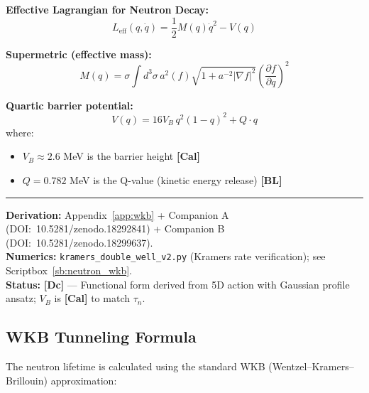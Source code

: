 \documentclass[11pt,a4paper]{article}
\newcommand{\tagDc}{\textcolor{blue!70!black}{\textbf{[Dc]}}}
\newcommand{\tagCal}{\textcolor{purple!70!black}{\textbf{[Cal]}}}
\newcommand{\tagBL}{\textcolor{gray!70!black}{\textbf{[BL]}}}
\begin{document}
\begin{resultbox}
\textbf{Effective Lagrangian for Neutron Decay:}
\begin{equation}
    L_{\text{eff}}(q, \dot{q}) = \frac{1}{2} M(q) \dot{q}^2 - V(q)
    \label{eq:L_eff_neutron}
\end{equation}

\textbf{Supermetric (effective mass):}
\begin{equation}
    M(q) = \sigma \int d^3\sigma \, a^2(f) \sqrt{1 + a^{-2}|\nabla f|^2} \left( \frac{\partial f}{\partial q} \right)^2
    \label{eq:supermetric}
\end{equation}

\textbf{Quartic barrier potential:}
\begin{equation}
    V(q) = 16 V_B \, q^2 (1-q)^2 + Q \cdot q
    \label{eq:quartic_potential}
\end{equation}
where:
\begin{itemize}[nosep]
    \item $V_B \approx 2.6$ MeV is the barrier height \tagCal{}
    \item $Q = 0.782$ MeV is the Q-value (kinetic energy release) \tagBL{}
\end{itemize}

\vspace{0.3em}\hrule\vspace{0.3em}
\textbf{Derivation:} Appendix~\ref{app:wkb} + Companion A (DOI:~10.5281/zenodo.18292841) + Companion B (DOI:~10.5281/zenodo.18299637).\\
\textbf{Numerics:} \texttt{kramers\_double\_well\_v2.py} (Kramers rate verification); see Scriptbox~\ref{sb:neutron_wkb}.\\
\textbf{Status:} \tagDc{} --- Functional form derived from 5D action with Gaussian profile ansatz; $V_B$ is \tagCal{} to match $\tau_n$.
\end{resultbox}

\subsection{WKB Tunneling Formula}

The neutron lifetime is calculated using the standard WKB (Wentzel--Kramers--Brillouin) approximation:
\end{document}
